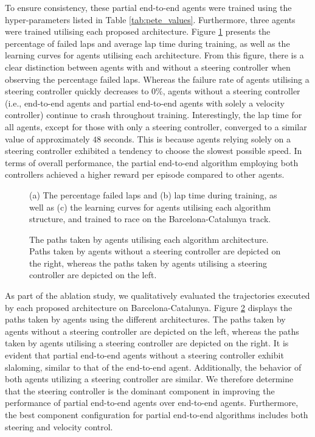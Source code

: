 To ensure consistency, these partial end-to-end agents were trained using the hyper-parameters listed in Table \ref{tab:pete_values}.
Furthermore, three agents were trained utilising each proposed architecture.
Figure \ref{fig:architecture_train} presents the percentage of failed laps and average lap time during training, as well as the learning curves for agents utilising each architecture.
From this figure, there is a clear distinction between agents with and without a steering controller when observing the percentage failed laps.
Whereas the failure rate of agents utilising a steering controller quickly decreases to $0\%$, agents without a steering controller (i.e., end-to-end agents and partial end-to-end agents with solely a velocity controller) continue to crash throughout training.
Interestingly, the lap time for all agents, except for those with only a steering controller, converged to a similar value of approximately $48$ seconds. 
This is because agents relying solely on a steering controller exhibited a tendency to choose the slowest possible speed.
In terms of overall performance, the partial end-to-end algorithm employing both controllers achieved a higher reward per episode compared to other agents. 

\begin{figure}[htb!]
    \centering
    
    \caption[Learning curves for agents utilising each algorithm structure]{(a) The percentage failed laps and (b) lap time during training, as well as (c) the learning curves for agents utilising each algorithm structure, and trained to race on the Barcelona-Catalunya track.}
    \label{fig:architecture_train}
\end{figure}

\begin{figure}[htb!]
    \centering
    
    \caption[Paths taken by agents utilising each algorithm architecture]{The paths taken by agents utilising each algorithm architecture. Paths taken by agents without a steering controller are depicted on the right, whereas the paths taken by agents utilising a steering controller are depicted on the left.}
    \label{fig:architecture_esp}
\end{figure}

As part of the ablation study, we qualitatively evaluated the trajectories executed by each proposed architecture on Barcelona-Catalunya.
Figure \ref{fig:architecture_esp} displays the paths taken by agents using the different architectures.
The paths taken by agents without a steering controller are depicted on the left, whereas the paths taken by agents utilising a steering controller are depicted on the right.
It is evident that partial end-to-end agents without a steering controller exhibit slaloming, similar to that of the end-to-end agent. 
Additionally, the behavior of both agents utilizing a steering controller are similar.
We therefore determine that the steering controller is the dominant component in improving the performance of partial end-to-end agents over end-to-end agents. 
Furthermore, the best component configuration for partial end-to-end algorithms includes both steering and velocity control.

